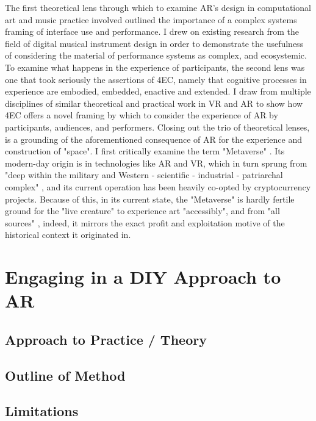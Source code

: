 The first theoretical lens through which to examine AR's design in computational art and music practice involved outlined the importance of a complex systems framing of interface use and performance. I drew on existing research from the field of digital musical instrument design \citep{magnusson2009a,discipio2003,essl2006,armstrong2006,hayes2019,chevalier2018} in order to demonstrate the usefulness of considering the material of performance systems as complex, and ecosystemic. To examine what happens in the experience of participants, the second lens was one that took seriously the assertions of 4EC, namely that cognitive processes in experience are embodied, embedded, enactive and extended. I draw from multiple disciplines of similar theoretical and practical work in VR and AR to show how 4EC offers a novel framing by which to consider the experience of AR by participants, audiences, and performers. Closing out the trio of theoretical lenses, is a grounding of the aforementioned consequence of AR for the experience and construction of "space". I first critically examine the term "Metaverse" \citep{stephenson1992}. Its modern-day origin is in technologies like AR and VR, which in turn sprung from "deep within the military and Western - scientific - industrial - patriarchal complex" \cite{davies2004}, and its current operation has been heavily co-opted by cryptocurrency projects. Because of this, in its current state, the "Metaverse" is hardly fertile ground for the "live creature" to experience art "accessibly", and from "all sources" \citep{dewey1934,leddy2021}, indeed, it mirrors the exact profit and exploitation motive of the historical context it originated in.



\section{Engaging in a DIY Approach to AR} \label{sec: discussion-method}
\subsection{Approach to Practice / Theory}
\subsection{Outline of Method}
\subsection{Limitations}
